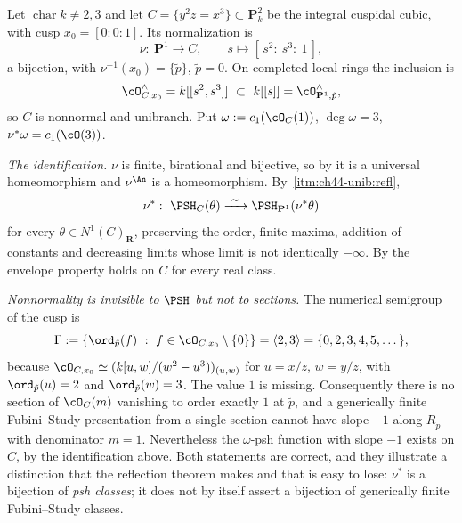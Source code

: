 \begin{example}
\label{ex:ch45-cusp-computed}
Let $\operatorname{char}k\ne2,3$ and let
$C=\{y^2z=x^3\}\subset\mathbf P^2_k$ be the integral cuspidal cubic, with
cusp $x_0=[0:0:1]$.  Its normalization is
\[
 \nu:\ \mathbf P^1\longrightarrow C,
 \qquad
 s\longmapsto[\,s^2:\ s^3:\ 1\,],
\]
a bijection, with $\nu^{-1}(x_0)=\{\tilde p\}$, $\tilde p=0$.  On
completed local rings the inclusion is
\[
 \cO^{\wedge}_{C,x_0}=k[[s^2,s^3]]\ \subset\ k[[s]]
 =\cO^{\wedge}_{\mathbf P^1,\tilde p},
\]
so $C$ is nonnormal and unibranch.  Put
$\omega:=c_1(\cO_C(1))$, $\deg\omega=3$, $\nu^*\omega=c_1(\cO(3))$.

\emph{The identification.}  $\nu$ is finite, birational and bijective, so
by  it is a universal
homeomorphism and $\nu^{\An}$ is a homeomorphism.  By
\,\cref{itm:ch44-unib:refl},
\[
 \nu^*:\ \PSH_C(\theta)\xrightarrow{\ \sim\ }\PSH_{\mathbf P^1}(\nu^*\theta)
\]
for every $\theta\in N^1(C)_{\mathbf R}$, preserving the order, finite
maxima, addition of constants and decreasing limits whose limit is not
identically $-\infty$.  By
 the envelope property holds on $C$ for every
real class.

\emph{Nonnormality is invisible to $\PSH$ but not to sections.}  The
numerical semigroup of the cusp is
\[
 \Gamma:=\{\ord_{\tilde p}(f)\ :\ f\in\cO_{C,x_0}\setminus\{0\}\}
 =\langle2,3\rangle=\{0,2,3,4,5,\dots\},
\]
because $\cO_{C,x_0}\simeq(k[u,w]/(w^2-u^3))_{(u,w)}$ for
$u=x/z$, $w=y/z$, with $\ord_{\tilde p}(u)=2$ and
$\ord_{\tilde p}(w)=3$.  The value $1$ is missing.  Consequently there
is no section of $\cO_C(m)$ vanishing to order exactly $1$ at
$\tilde p$, and a generically finite Fubini--Study presentation from a
single section cannot have slope $-1$ along $R_{\tilde p}$ with
denominator $m=1$.  Nevertheless the $\omega$-psh function
with slope $-1$ exists on $C$, by the identification above.  Both
statements are correct, and they illustrate a distinction that the
reflection theorem makes and that is easy to lose: $\nu^*$ is a bijection
of \emph{psh classes}; it does not by itself assert a bijection of
generically finite Fubini--Study classes.


\end{example}
